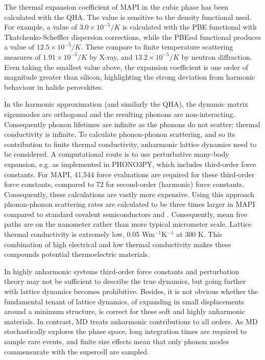 The thermal expansion coefficient of MAPI in the cubic phase has been calculated with the QHA.
The value is sensitive to the density functional used.
For example, a value of $3.0 \times 10^{-5} /K$ is calculated with the PBE functional with Tkatchenko-Scheffler dispersion corrections,\autocite{Saidi2016} while the PBEsol functional produces a value of $12.5 \times 10^{-5} /K$.\autocite{Brivio2015a} 
These compare to finite temperature scattering measures of $1.91 \times 10^{-5} /K$ by X-ray,\autocite{Baikie2013} and $13.2 \times 10^{-5} /K$ by neutron diffraction.\autocite{Weller2015} 
Even taking the smallest value above, the expansion coefficient is one order of magnitude greater than silicon,\autocite{Madelung2003} highlighting the strong deviation from harmonic behaviour in halide perovskites.

In the harmonic approximation (and similarly the QHA), the dynamic matrix eigenmodes are orthogonal and the resulting phonons are non-interacting.
Consequently phonon lifetimes are infinite as the phonons do not scatter; thermal conductivity is infinite. 
To calculate phonon-phonon scattering, and so its contribution to finite thermal conductivity, anharmonic lattice dynamics need to be considered.
A computational route is to use perturbative many-body expansion, e.g. as implemented in \textsc{PHONO3PY},\autocite{Togo2015} which includes third-order force constants. 
For MAPI, 41,544 force evaluations are required for these third-order force constants, compared to 72 for second-order (harmonic) force constants.\autocite{Whalley2016}
Consequently, these calculations are vastly more expensive. 
Using this approach phonon-phonon scattering rates are calculated to be three times larger in MAPI compared to standard covalent semiconductors  and .\autocite{Whalley2016} 
Consequently, mean free paths are on the nanometer rather than more typical micrometer scale. 
Lattice thermal conductivity is extremely low, 0.05 Wm$^{-1}$K$^{-1}$ at 300 K.\autocite{Whalley2016}
This combination of high electrical and low thermal conductivity makes these compounds potential thermoelectric materials.\autocite{He2014,Mettan2015}

In highly anharmonic systems third-order force constants and perturbation theory may not be sufficient
to describe the true dynamics, but going further with lattice dynamics becomes prohibitive.
Besides, it is not obvious whether the fundamental tenant of lattice dynamics, of expanding in small displacements around a minimum structure, is correct for these soft and highly anharmonic materials. 
In contrast, MD treats anharmonic contributions to all orders. As MD stochastically explores the phase space, long integration times are required to sample rare events, and finite size effects mean that only phonon modes commensurate with the supercell are sampled.  
